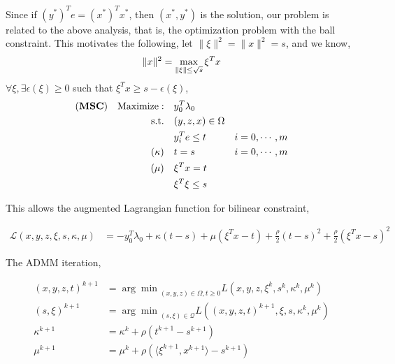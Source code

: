 \documentclass[../main]{subfiles}
\begin{document}
Since if \((y^*)^Te = (x^*)^Tx^*\), then \((x^*, y^*)\) is the solution, our problem is related to the above analysis, that is, the optimization problem with the ball constraint.
This motivates the following, let \(\|\xi\|^2 = \|x\|^2 = s\), and we know,
\begin{equation}
    \|x\|^2 = \max_{\|\xi\| \le \sqrt s} \xi^T x \\
\end{equation}
\(\forall \xi, \exists \epsilon(\xi) \ge 0\) such that \(\xi^Tx \ge s - \epsilon(\xi)\),
\begin{align}
    (\textbf{MSC}) \quad \mathrm{Maximize: }\quad & y_0 ^T\lambda_0                     \\
    \mathrm{s.t.} \quad                        & (y,z,x) \in \Omega                  \\
                                               & y_i^Te \le t       & i=0, \cdots, m \\
    (\kappa) \quad                             & t= s               & i=0, \cdots, m \\
    (\mu)    \quad                             & \xi^Tx = t                          \\
                                               & \xi^T\xi \le s
\end{align}

This allows the augmented Lagrangian function for bilinear constraint,

\begin{align*}
    \mathscr L\left(x,y,z,\xi,s,\kappa,\mu\right) & = - y_0 ^T\lambda_0 + \kappa(t-s) + \mu(\xi^Tx - t) + \frac{\rho}{2}(t-s)^2 + \frac{\rho}{2}(\xi^Tx - s)^2
\end{align*}

The ADMM iteration,

\begin{align*}
    (x,y,z,t)^{k+1} & = {\arg\min}_{(x,y,z)\in\Omega, t\ge 0} L\left(x,y,z,\xi^k,s^k,\kappa^k,\mu^k\right)       \\
    (s, \xi)^{k+1}  & = {\arg\min}_{(s, \xi)\in\mathscr{Q}} L\left((x,y,z,t)^{k+1},\xi,s, \kappa^k, \mu^k\right) \\
    \kappa^{k+1}    & = \kappa^k + \rho\left(t^{k+1}-s^{k+1}\right)                                              \\
    \mu^{k+1}       & = \mu^k + \rho\left( \langle\xi^{k+1}, x^{k+1}\rangle - s^{k+1}\right)                     \\
\end{align*}
\end{document}
